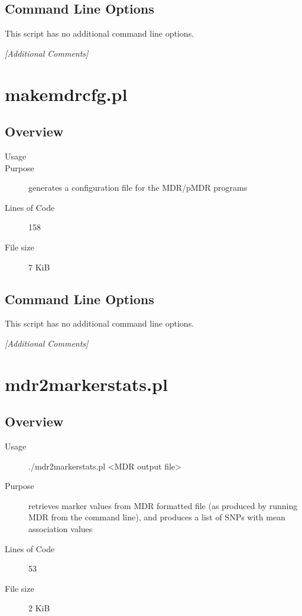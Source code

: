 \subsection{Command Line Options}
\label{sec:make-documentation.pl-command-line}

This script has no additional command line options.

\emph{[Additional Comments]}

\section{makemdrcfg.pl}
\label{sec:makemdrcfg.pl}

\subsection{Overview}
\label{sec:makemdrcfg.pl-overview}

\begin{description}
\item[Usage] 
\item[Purpose] generates a configuration file for the MDR/pMDR programs
\item[Lines of Code] 158
\item[File size] 7 KiB
\end{description}

\subsection{Command Line Options}
\label{sec:makemdrcfg.pl-command-line}

This script has no additional command line options.

\emph{[Additional Comments]}

\section{mdr2markerstats.pl}
\label{sec:mdr2markerstats.pl}

\subsection{Overview}
\label{sec:mdr2markerstats.pl-overview}

\begin{description}
\item[Usage] ./mdr2markerstats.pl <MDR output file>
\item[Purpose] retrieves marker values from MDR formatted file (as produced by running MDR from the command line), and produces a list of SNPs with mean association values
\item[Lines of Code] 53
\item[File size] 2 KiB
\end{description}

